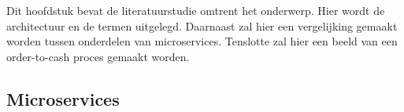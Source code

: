 \chapter{}
\label{ch:stand-van-zaken}



Dit hoofdstuk bevat de literatuurstudie omtrent het onderwerp. Hier wordt de architectuur en de termen uitgelegd. Daarnaast zal hier een vergelijking gemaakt worden tussen onderdelen van microservices. Tenslotte zal hier een beeld van een order-to-cash proces gemaakt worden.

\section{Microservices}
